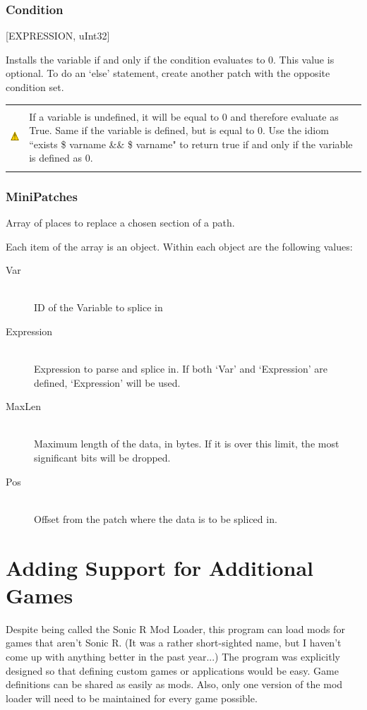 \documentclass[12pt,a4paper,notitlepage]{article}
\newcommand{\warning}[1]{
    \begin{tabular}{m{1.1cm}  m{11cm}}
    &\\
    \includegraphics[width=1.1cm, height=1.1cm]{warning} & #1
    \\&\\
    \end{tabular}
}
\begin{document}
\subsubsection{Condition}
[EXPRESSION, uInt32]

Installs the variable if and only if the condition evaluates to 0. This value is optional. To do an `else' statement, create another patch with the opposite condition set.

\warning{If a variable is undefined, it will be equal to 0 and therefore evaluate as True. Same if the variable is defined, but is equal to 0. Use the idiom ``exists \$ varname \&\& \$ varname" to return true if and only if the variable is defined as 0.}

\subsubsection{MiniPatches}
Array of places to replace a chosen section of a path.

Each item of the array is an object. Within each object are the following values:
\begin{description}
\item[Var] \hfill \\ 
    ID of the Variable to splice in
\item[Expression] \hfill \\
    Expression to parse and splice in. If both `Var' and `Expression' are defined, `Expression' will be used.
\item[MaxLen] \hfill \\
    Maximum length of the data, in bytes. If it is over this limit, the most significant bits will be dropped.
\item[Pos] \hfill \\
    Offset from the patch where the data is to be spliced in.
\end{description}


\pagebreak
\section{Adding Support for Additional Games}
\label{sec:games}
Despite being called the Sonic R Mod Loader, this program can load mods for games that aren't Sonic R. (It was a rather short-sighted name, but I haven't come up with anything better in the past year...) The program was explicitly designed so that defining custom games or applications would be easy. Game definitions can be shared as easily as mods. Also, only one version of the mod loader will need to be maintained for every game possible.
\end{document}
